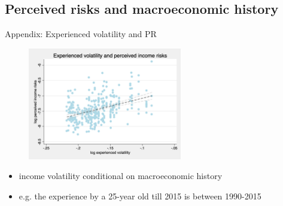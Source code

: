 \documentclass{beamer}
\begin{document}
\subsection{Perceived risks and macroeconomic history}




\begin{frame}{Appendix: Experienced volatility and PR}
	\begin{figure}
		\centering 
		\label{experience_var_var_var}
		\includegraphics[width=0.6\textwidth]{figures/experience_var_var_data.png}
	\end{figure}
	\begin{itemize}
		\item income volatility conditional on macroeconomic history \cite{storesletten2004cyclical}
		\item e.g. the experience by a 25-year old till 2015 is between 1990-2015
	\end{itemize}
\end{frame}
\end{document}

